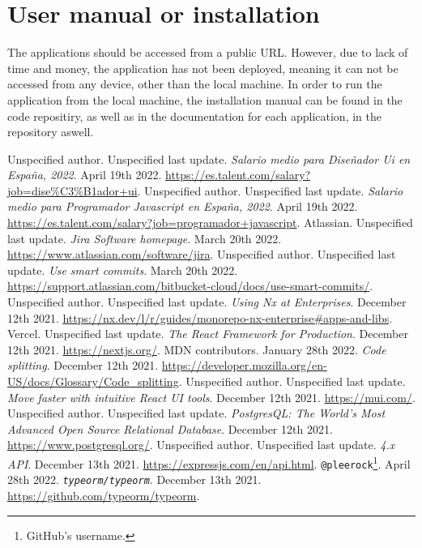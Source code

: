 \documentclass[a4paper, 12pt, oneside]{book}
\begin{document}
\chapter{User manual or installation}
The applications should be accessed from a public URL. However, due to lack of time and money, the application has not been deployed, meaning it can not be accessed from any device, other than the local machine. In order to run the application from the local machine, the installation manual can be found in the code repositiry, as well as in the documentation for each application, in the repository aswell.
\begin{thebibliography}{9}
	Unspecified author. Unspecified last update. \emph{Salario medio para Diseñador Ui en España, 2022}. April 19th 2022. \url{https://es.talent.com/salary?job=dise%C3%B1ador+ui}.
	Unspecified author. Unspecified last update. \emph{Salario medio para Programador Javascript en España, 2022}. April 19th 2022. \url{https://es.talent.com/salary?job=programador+javascript}.
	Atlassian. Unspecified last update. \emph{Jira Software homepage}. March 20th 2022. \url{https://www.atlassian.com/software/jira}.
	Unspecified author. Unspecified last update. \emph{Use smart commits}. March 20th 2022. \url{https://support.atlassian.com/bitbucket-cloud/docs/use-smart-commits/}.
	Unspecified author. Unspecified last update. \emph{Using Nx at Enterprises}. December 12th 2021. \url{https://nx.dev/l/r/guides/monorepo-nx-enterprise#apps-and-libs}.
	Vercel. Unspecified last update. \emph{The React Framework for Production}. December 12th 2021. \url{https://nextjs.org/}.
	MDN contributors. January 28th 2022. \emph{Code splitting}. December 12th 2021. \url{https://developer.mozilla.org/en-US/docs/Glossary/Code_splitting}.
	Unspecified author. Unspecified last update. \emph{Move faster with intuitive React UI tools}. December 12th 2021. \url{https://mui.com/}.
	Unspecified author. Unspecified last update. \emph{PostgresQL: The World's Most Advanced Open Source Relational Database}. December 12th 2021. \url{https://www.postgresql.org/}.
	Unspecified author. Unspecified last update. \emph{4.x API}. December 13th 2021. \url{https://expressjs.com/en/api.html}.
	\texttt{@pleerock}\footnote{GitHub's username.}. April 28th 2022. \emph{\texttt{typeorm/typeorm}}. December 13th 2021. \url{https://github.com/typeorm/typeorm}.

\end{thebibliography}
\end{document}
